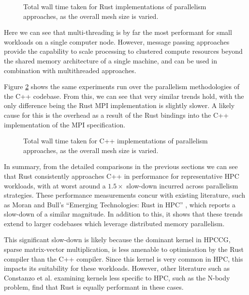 \begin{figure}[H]
    \centering
    
    \vspace*{-0.5cm}
    \caption{Total wall time taken for Rust implementations of parallelism approaches, as the overall mesh size is varied.}
    \label{fig:translation_parallelism_rust}
\end{figure}

Here we can see that multi-threading is by far the most performant for small workloads on a single computer node. However, message passing approaches provide the capability to scale processing to clustered compute resources beyond the shared memory architecture of a single machine, and can be used in combination with multithreaded approaches.

Figure \ref{fig:translation_parallelism_cpp} shows the same experiments run over the parallelism methodologies of the C++ codebase. From this, we can see that very similar trends hold, with the only difference being the Rust MPI implementation is slightly slower. A likely cause for this is the overhead as a result of the Rust bindings into the C++ implementation of the MPI specification.

\begin{figure}[H]
    \centering
    
    \vspace*{-0.5cm}
    \caption{Total wall time taken for C++ implementations of parallelism approaches, as the overall mesh size is varied.}
    \label{fig:translation_parallelism_cpp}
\end{figure}

In summary, from the detailed comparisons in the previous sections we can see that Rust consistently approaches C++ in performance for representative \acrshort{HPC} workloads, with at worst around a $1.5 \times$ slow-down incurred across parallelism strategies. These performance measurements concur with existing literature, such as Moran and Bull's ``Emerging Technologies: Rust in HPC'' \cite{moranEmergingTechnologiesRust2023}, which reports a slow-down of a similar magnitude. In addition to this, it shows that these trends extend to larger codebases which leverage distributed memory parallelism.

This significant slow-down is likely because the dominant kernel in HPCCG, sparse matrix-vector multiplication, is less amenable to optimisation by the Rust compiler than the C++ compiler. Since this kernel is very common in \acrshort{HPC}, this impacts its suitability for these workloads. However, other literature such as Constanzo et al. \cite{costanzoPerformanceVsProgramming2021} examining kernels less specific to \acrshort{HPC}, such as the N-body problem, find that Rust is equally performant in these cases.

